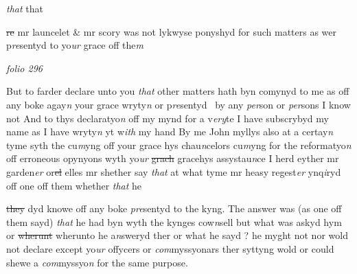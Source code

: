 \documentclass[12pt, a4paper]{book}
\begin{document}
               \textit{that}
               that 
			
               \sout{re} mr launcelet \& mr scory was not lykwyse ponyshyd for such matters as wer p\textit{re}sentyd to yo\textit{ur} grace off the\textit{m}
               
\dotfill
					

\textit{folio 296}


But to farder declare unto you \textit{that} other matters hath byn comynyd to me as 
			off any boke agay\textit{n} your grace wryty\textit{n} or p\textit{re}sentyd  by any \textit{per}son or \textit{per}sons I know not And to thys declaratyo\textit{n} off my mynd for a v\textit{ery}te I have subscrybyd my name  as I have wryty\textit{n} yt w\textit{ith} my hand  By me John myllys   also at a certay\textit{n} tyme syth the cu\textit{m}yng off your grace hys chau\textit{n}celors cu\textit{m}yng for the reformatyo\textit{n} off erroneous opynyons wyth yo\textit{ur}
               \sout{grach} gracehys assystau\textit{n}ce I herd eyther mr garden\textit{er} or\sout{el} elles mr shether say \textit{that} at what tyme mr heasy regest\textit{er} ynq\textit{i}ryd off one off them whether \textit{that}
               he \sout{}
			
               \sout{they }dyd knowe off any boke \textit{pre}sentyd to the kyng. The answer was (as one off them sayd) \textit{that} he had byn wyth  the kynges cow\textit{n}sell but what was askyd hym or \sout{wherunt} wherunto he a\textit{n}sweryd ther or what he sayd ? he myght not nor wold not declare except yo\textit{ur} offycers or \textit{com}myssyonars ther syttyng wold or could shewe a \textit{com}myssyo\textit{n} for the same purpose.   

\dotfill
					  \section*{}  \subsection*{}
\end{document}

